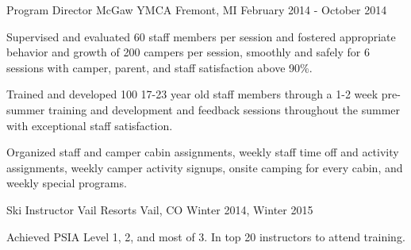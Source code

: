 

\begin{cventries}

  \cventry
    {Program Director} %
    {McGaw YMCA} %
    {Fremont, MI} %
    {February 2014 - October 2014} %
    {
      \begin{cvitems} %
        \item {Supervised and evaluated 60 staff members per session and fostered appropriate behavior and growth of 200 campers per session, smoothly and safely for 6 sessions with camper, parent, and staff satisfaction above 90\%.}
        \item {Trained and developed 100 17-23 year old staff members through a 1-2 week pre-summer training and development and feedback sessions throughout the summer with exceptional staff satisfaction.}
        \item {Organized staff and camper cabin assignments, weekly staff time off and activity assignments, weekly camper activity signups, onsite camping for every cabin, and weekly special programs.}
      \end{cvitems}
    }
    
 \cventry
    {Ski Instructor} %
    {Vail Resorts} %
    {Vail, CO} %
    {Winter 2014, Winter 2015} %
    {
      \begin{cvitems} %
        \item {Achieved PSIA Level 1, 2, and most of 3. In top 20 instructors to attend training.}
      \end{cvitems}
    }



\end{cventries}
